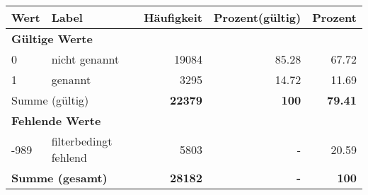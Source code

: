      \begin{longtable}{lXrrr}
     \toprule
     \textbf{Wert} & \textbf{Label} & \textbf{Häufigkeit} & \textbf{Prozent(gültig)} & \textbf{Prozent} \\
     \endhead
     \midrule
     \multicolumn{5}{l}{\textbf{Gültige Werte}}\\

     0 &
     \multicolumn{1}{X}{ nicht genannt   } &


       \num{19084} &
       \num[round-mode=places,round-precision=2]{85.28} &
         \num[round-mode=places,round-precision=2]{67.72} \\

     1 &
     \multicolumn{1}{X}{ genannt   } &


       \num{3295} &
       \num[round-mode=places,round-precision=2]{14.72} &
         \num[round-mode=places,round-precision=2]{11.69} \\
     \midrule
     \multicolumn{2}{l}{Summe (gültig)} &
       \textbf{\num{22379}} &
     \textbf{100} &
       \textbf{\num[round-mode=places,round-precision=2]{79.41}} \\
     \multicolumn{5}{l}{\textbf{Fehlende Werte}}\\
       -989 &
       filterbedingt fehlend &
         \num{5803} &
        - &
         \num[round-mode=places,round-precision=2]{20.59} \\
     \midrule
     \multicolumn{2}{l}{\textbf{Summe (gesamt)}} &
          \textbf{\num{28182}} &
        \textbf{-} &
        \textbf{100} \\
     \bottomrule
     \end{longtable}
     
